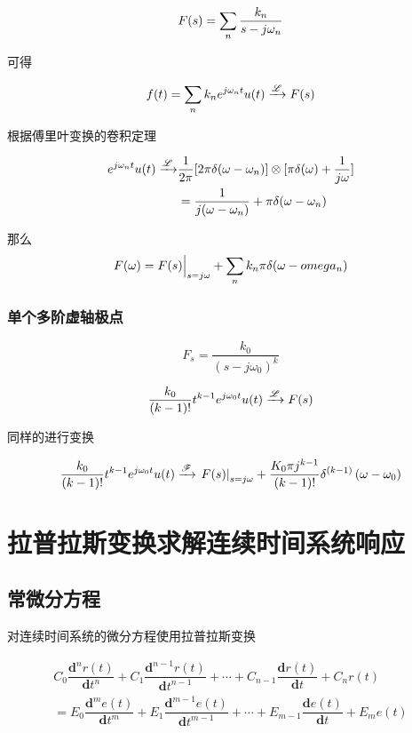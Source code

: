 \documentclass[cn,11pt,chinese,black,simple]{../elegantbook}
\begin{document}
\[F(s) = \displaystyle\sum_n \dfrac{k_n}{s - j\omega_n}\]

可得

\[f(t) = \displaystyle\sum_n k_n e^{j \omega_n t}u(t) \xrightarrow{\mathscr{L}} F(s)\]

根据傅里叶变换的卷积定理 

\[\begin{aligned}
    e^{j \omega_n t} u(t) \xrightarrow{\mathscr{L}} &\dfrac{1}{2 \pi} [2 \pi \delta(\omega - \omega_n)] \otimes [\pi \delta(\omega) + \dfrac{1}{j \omega}]\\
    &= \dfrac{1}{j (\omega - \omega_n)} + \pi \delta(\omega - \omega_n)
\end{aligned}\]

那么\[F(\omega) = F(s)\Big|_{s = j\omega} + \displaystyle\sum_n k_n \pi \delta(\omega-omega_n)\]

\subsubsection{单个多阶虚轴极点}

\[F_{s} = \dfrac{k_0}{(s-j\omega_0)^k}\]

\[\dfrac{k_0}{(k-1)!}t^{k-1}e^{j\omega_0 t}u(t) \xrightarrow{\mathscr{L}} F(s)\]

同样的进行变换

\[\dfrac{k_0}{(k-1)!}t^{k-1}e^{j\omega_0 t}u(t) \xrightarrow{\mathscr{F}} \left.F(s)\right|_{s=j \omega}+\dfrac{K_{0} \pi j^{k-1}}{(k-1) !} \delta^{(k-1)}\left(\omega-\omega_{0}\right)\]



\section{拉普拉斯变换求解连续时间系统响应}

\subsection{常微分方程}

对连续时间系统的微分方程使用拉普拉斯变换

\[
\begin{array}{l}
{C}_{0} \dfrac{\mathbf{d}^{n} {r}({t})}{\mathbf{d} t^{n}}+{C}_{1} \dfrac{\mathbf{d}^{n-1} {r}({t})}{\mathbf{d} {t}^{n-1}}+\cdots+{C}_{n-1} \dfrac{\mathbf{d} {r}({t})}{\mathbf{d} t}+{C}_{n} {r}({t}) \\
={E}_{0} \dfrac{\mathbf{d}^{m} {e}({t})}{\mathbf{d} t^{m}}+{E}_{1} \dfrac{\mathbf{d}^{m-1} {e}({t})}{\mathbf{d} t^{m-1}}+\cdots+{E}_{m-1} \dfrac{\mathbf{d} e({t})}{\mathbf{d} t}+{E}_{m} {e}({t})
\end{array}
\]
\end{document}
